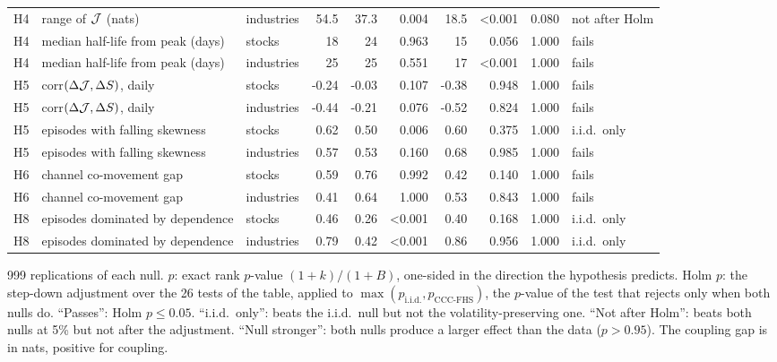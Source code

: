 \begin{table}[p]
{\begin{tabular}{@{}lllrrrrrrl@{}}
H4 & range of $\mathcal{J}$ (nats) & industries & 54.5 & 37.3 & 0.004 & 18.5 & <0.001 & 0.080 & not after Holm \\
H4 & median half-life from peak (days) & stocks & 18 & 24 & 0.963 & 15 & 0.056 & 1.000 & fails \\
H4 & median half-life from peak (days) & industries & 25 & 25 & 0.551 & 17 & <0.001 & 1.000 & fails \\
H5 & corr$(\Delta\mathcal{J},\Delta S)$, daily & stocks & -0.24 & -0.03 & 0.107 & -0.38 & 0.948 & 1.000 & fails \\
H5 & corr$(\Delta\mathcal{J},\Delta S)$, daily & industries & -0.44 & -0.21 & 0.076 & -0.52 & 0.824 & 1.000 & fails \\
H5 & episodes with falling skewness & stocks & 0.62 & 0.50 & 0.006 & 0.60 & 0.375 & 1.000 & i.i.d.\ only \\
H5 & episodes with falling skewness & industries & 0.57 & 0.53 & 0.160 & 0.68 & 0.985 & 1.000 & fails \\
H6 & channel co-movement gap & stocks & 0.59 & 0.76 & 0.992 & 0.42 & 0.140 & 1.000 & fails \\
H6 & channel co-movement gap & industries & 0.41 & 0.64 & 1.000 & 0.53 & 0.843 & 1.000 & fails \\
H8 & episodes dominated by dependence & stocks & 0.46 & 0.26 & <0.001 & 0.40 & 0.168 & 1.000 & i.i.d.\ only \\
H8 & episodes dominated by dependence & industries & 0.79 & 0.42 & <0.001 & 0.86 & 0.956 & 1.000 & i.i.d.\ only \\
\bottomrule\end{tabular}}
\par\medskip\begin{minipage}{0.95\linewidth}\footnotesize
999 replications of each null. $p$: exact rank $p$-value $(1+k)/(1+B)$, one-sided in the direction the hypothesis
predicts. Holm $p$: the \citet{holm1979} step-down adjustment over the 26 tests of the table, applied to
$\max(p_{\text{i.i.d.}},p_{\text{CCC-FHS}})$, the $p$-value of the test that rejects only when both nulls do. ``Passes'': Holm $p\le0.05$.
``i.i.d.\ only'': beats the i.i.d.\ null but not the volatility-preserving one. ``Not after Holm'': beats both nulls at 5\% but not after the adjustment.
``Null stronger'': both nulls produce a larger effect than the data ($p>0.95$). The coupling gap is in nats, positive for coupling.
\end{minipage}
\end{table}

